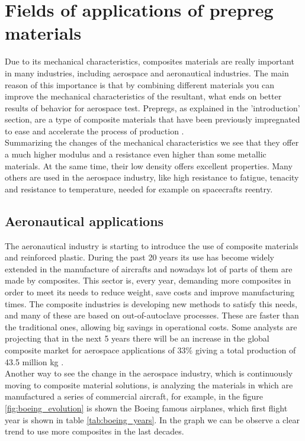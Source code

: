 \section{Fields of applications of prepreg materials}

Due to its mechanical characteristics, composites materials are really important in many industries, including aerospace and aeronautical industries. The main reason of this importance is that by combining different materials you can improve the mechanical characteristics of the resultant, what ends on better results of behavior for aerospace test. Prepregs, as explained in the 'introduction' section, are a type of composite materials that have been previously impregnated to ease and accelerate the process of production  \cite{Wulfsberg2014a}.\\

Summarizing the changes of the mechanical characteristics we see that they offer a much higher modulus and a resistance even higher than some metallic materials. At the same time, their low density offers excellent properties. Many others are used in the aerospace industry, like high resistance to fatigue, tenacity and resistance to temperature, needed for example on spacecrafts reentry.\\

\subsection{Aeronautical applications}

The aeronautical industry is starting to introduce the use of composite materials
and reinforced plastic. During the past 20 years its use has become widely extended
in the manufacture of aircrafts and nowadays lot of parts of them are made by composites.
This sector is, every year, demanding more composites in order to meet its needs
to reduce weight, save costs and improve manufacturing times. The composite industries
is developing new methods to satisfy this needs, and many of these are based on
out-of-autoclave processes. These are faster than the traditional ones, allowing
big savings in operational costs. Some analysts are projecting that in the next
5 years there will be an increase in the global composite market for aerospace
applications of  33\% giving a total production of 43.5 million kg  \cite{Holmes2017}.\\

Another way to see the change in the aerospace industry, which is continuously
moving to composite material solutions, is analyzing the materials in which are
manufactured a series of commercial aircraft, for example, in the figure \ref{fig:boeing_evolution} is
shown the Boeing famous airplanes, which first flight year is shown in table \ref{tab:boeing_years}. In the graph we can be observe a clear trend to use
more composites in the last decades\cite{Zhang2018}.\\

